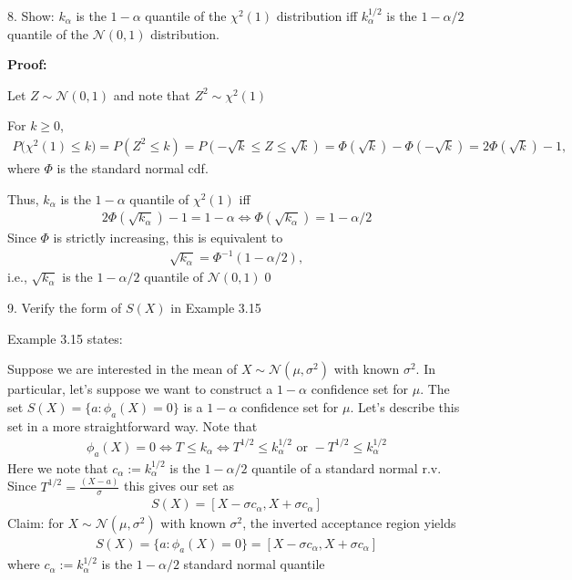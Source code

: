 \documentclass[10pt]{article}
\begin{document}
8. Show: $k_\alpha $ is the $1 - \alpha $ quantile of the $\chi^2(1)$ distribution iff $k_\alpha^{1/2}$ is the $1 - \alpha / 2 $ quantile of the $\mathcal{N}(0, 1)$ distribution.

\textbf{Proof:}

Let $Z \sim \mathcal{N}(0, 1) $ and note that $Z^2 \sim\chi^2(1)$

For $k \ge 0 $,
\begin{gather*}
    P\big(\chi^2(1) \le k\big) = P(Z^2\le k) = P(-\sqrt{k}\le Z \le \sqrt{k}) = \Phi(\sqrt{k}) - \Phi(-\sqrt{k})= 2\Phi(\sqrt{k}) - 1,
\end{gather*}
where $\Phi $ is the standard normal cdf. 

Thus, $k_\alpha $ is the $1 - \alpha $ quantile of $\chi^2(1) $ iff 
\begin{gather*}
    2\Phi(\sqrt{k_\alpha}) - 1 = 1 - \alpha \iff \Phi(\sqrt{k_\alpha}) = 1 - \alpha / 2
\end{gather*}
Since $\Phi $ is strictly increasing, this is equivalent to 
\begin{gather*}
    \sqrt{k_\alpha} = \Phi^{-1}(1 - \alpha / 2),
\end{gather*}
i.e., $\sqrt{k_\alpha}$ is the $1 - \alpha / 2 $ quantile of $\mathcal{N}(0, 1)$\qed

\newpage 

9. Verify the form of $S(X) $ in Example 3.15

Example 3.15 states: 

Suppose we are interested in the mean of $X \sim \mathcal{N}(\mu, \sigma^2)$ with known $\sigma^2 $. In particular, let's suppose we want to construct a $1 - \alpha $ confidence set for $\mu $. The set $S(X) = \{a : \phi_a (X) = 0\}$ is a $1 - \alpha $ confidence set for $\mu $. Let's describe this set in a more straightforward way. Note that 
\begin{gather*}
    \phi_a(X) = 0 \iff T \le k_\alpha \iff T^{1 / 2} \le k_\alpha^{1 / 2} \text{ or } -T^{1 / 2} \le k_\alpha^{1 / 2}
\end{gather*}
Here we note that $c_\alpha := k_\alpha^{1 / 2}$ is the $1 - \alpha / 2 $ quantile of a standard normal r.v. Since $T^{1 / 2} = \frac{(X - a)}{\sigma}$ this gives our set as 
\begin{gather*}
    S(X) = [X - \sigma c_\alpha, X + \sigma c_\alpha]
\end{gather*}
Claim: for $X \sim \mathcal{N}(\mu, \sigma^2)$ with known $\sigma^2 $, the inverted acceptance region yields 
\begin{gather*}
    S(X) = \{a : \phi_a(X) = 0\} = [X - \sigma c_\alpha, X + \sigma c_\alpha]
\end{gather*}
where $c_\alpha := k_\alpha^{1 / 2}$ is the $1 - \alpha / 2 $ standard normal quantile
\end{document}
